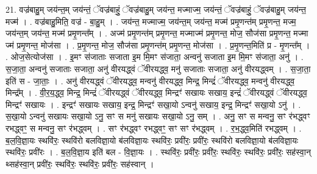 \documentclass[17pt]{extarticle}
\begin{document}
21. वज्र॑बाहु॒म् जय॑न्त॒म् जय॑न्तं॒ ॅवज्र॑बाहुं॒ ॅवज्र॑बाहु॒म् जय॑न्त॒ मज्माज्म॒ जय॑न्तं॒ ॅवज्र॑बाहुं॒ ॅवज्र॑बाहु॒म् जय॑न्त॒ मज्म॑ । . वज्र॑बाहु॒मिति॒ वज्र॑ - बा॒हु॒म् । . जय॑न्त॒ मज्माज्म॒ जय॑न्त॒म् जय॑न्त॒ मज्म॑ प्रमृ॒णन्त॑म् प्रमृ॒णन्त॒ मज्म॒ जय॑न्त॒म् जय॑न्त॒ मज्म॑ प्रमृ॒णन्त᳚म् । . अज्म॑ प्रमृ॒णन्त॑म् प्रमृ॒णन्त॒ मज्माज्म॑ प्रमृ॒णन्त॒ मोज॒ सौज॑सा प्रमृ॒णन्त॒ मज्मा ज्म॑ प्रमृ॒णन्त॒ मोज॑सा । . प्र॒मृ॒णन्त॒ मोज॒ सौज॑सा प्रमृ॒णन्त॑म् प्रमृ॒णन्त॒ मोज॑सा । . प्र॒मृ॒णन्त॒मिति॑ प्र - मृ॒णन्त᳚म् । . ओज॒सेत्योज॑सा । . इ॒मꣳ स॑जाताः सजाता इ॒म मि॒मꣳ स॑जाता॒ अन्वनु॑ सजाता इ॒म मि॒मꣳ स॑जाता॒ अनु॑ । . स॒जा॒ता॒ अन्वनु॑ सजाताः सजाता॒ अनु॑ वीरयद्ध्वं ॅवीरयद्ध्व॒ मनु॑ सजाताः सजाता॒ अनु॑ वीरयद्ध्वम् । . स॒जा॒ता॒ इति॑ स - जा॒ताः॒ । . अनु॑ वीरयद्ध्वं ॅवीरयद्ध्व॒ मन्वनु॑ वीरयद्ध्व॒ मिन्द्र॒ मिन्द्रं॑ ॅवीरयद्ध्व॒ मन्वनु॑ वीरयद्ध्व॒ मिन्द्र᳚म् । . वी॒र॒य॒द्ध्व॒ मिन्द्र॒ मिन्द्रं॑ ॅवीरयद्ध्वं ॅवीरयद्ध्व॒ मिन्द्रꣳ॑ सखायः सखाय॒ इन्द्रं॑ ॅवीरयद्ध्वं ॅवीरयद्ध्व॒ मिन्द्रꣳ॑ सखायः । . इन्द्रꣳ॑ सखायः सखाय॒ इन्द्र॒ मिन्द्रꣳ॑ सखा॒यो ऽन्वनु॑ सखाय॒ इन्द्र॒ मिन्द्रꣳ॑ सखा॒यो ऽनु॑ । . स॒खा॒यो ऽन्वनु॑ सखायः सखा॒यो ऽनु॒ सꣳ स मनु॑ सखायः सखा॒यो ऽनु॒ सम् । . अनु॒ सꣳ स मन्वनु॒ सꣳ र॑भद्ध्वꣳ रभद्ध्वꣳ॒॒ स मन्वनु॒ सꣳ र॑भद्ध्वम् । . सꣳ र॑भद्ध्वꣳ रभद्ध्वꣳ॒॒ सꣳ सꣳ र॑भद्ध्वम् । . र॒भ॒द्ध्व॒मिति॑ रभद्ध्वम् । . ब॒ल॒वि॒ज्ञा॒यः स्थवि॑रः॒ स्थवि॑रो बलविज्ञा॒यो ब॑लविज्ञा॒यः स्थवि॑रः॒ प्रवी॑रः॒ प्रवी॑रः॒ स्थवि॑रो बलविज्ञा॒यो ब॑लविज्ञा॒यः स्थवि॑रः॒ प्रवी॑रः । . ब॒ल॒वि॒ज्ञा॒य इति॑ बल - वि॒ज्ञा॒यः । . स्थवि॑रः॒ प्रवी॑रः॒ प्रवी॑रः॒ स्थवि॑रः॒ स्थवि॑रः॒ प्रवी॑रः॒ सह॑स्वा॒न् थ्सह॑स्वा॒न् प्रवी॑रः॒ स्थवि॑रः॒ स्थवि॑रः॒ प्रवी॑रः॒ सह॑स्वान् । \newline
\end{document}
